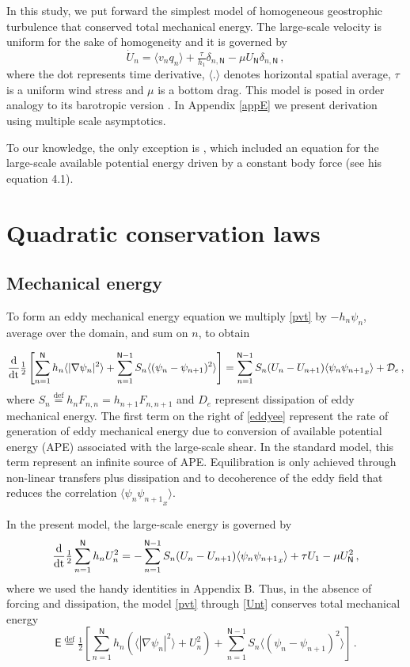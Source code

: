\documentclass{jfm}
\newcommand{\defn}{\ensuremath{\stackrel{\mathrm{def}}{=}}}
\def\beq{\begin{equation}}
\def\eeq{\end{equation}}
\newcommand{\com}{\, ,}
\newcommand{\per}{\, .}
\newcommand{\avxy}[1]{\langle{#1}\rangle}
\newcommand{\nmax}{\mathsf{N}}
\newcommand{\disse}{\mathcal{D}_e}
\newcommand{\dd}{\rm d}
\newcommand{\half}{\tfrac{1}{2}}
\newcommand{\sE}{\mathsf{E}}
\begin{document}
In this study, we put forward the simplest model of homogeneous geostrophic
turbulence that conserved total mechanical energy. The
large-scale velocity is uniform for the sake of homogeneity and it is governed by
\beq \label{Unt}
{\dot U_n} = \avxy{v_n q_n} + \tfrac{\tau}{h_1} \delta_{n,\nmax} -
\mu U_{\nmax}\delta_{n,\nmax} \com
\eeq
where the dot represents time derivative, $\avxy{.}$ denotes horizontal spatial
average, $\tau$ is a uniform wind stress and $\mu$ is a bottom drag.
This model is posed in order  analogy to its barotropic version
\citep{carnevale_frederiksen1987}. In Appendix \ref{appE} we present
derivation using multiple scale asymptotics.

To our
knowledge, the only exception is \cite{salmon1980}, which included an equation for
the large-scale available potential energy driven by a constant body force (see
his equation 4.1).

\section{Quadratic conservation laws}\label{sec:cons_laws}

\subsection{Mechanical energy}

To form an eddy mechanical energy equation we multiply \eqref{pvt} by
$-h_n \psi_n$, average over the domain, and sum on $n$, to obtain

\beq\label{eddyee}
  \frac{\dd}{\dd t}\half \left[\sum_{n=1}^{\nmax} h_n \avxy{|\nabla \psi_n|^2} +
  \sum_{n=1}^{\nmax-1} S_n \avxy{(\psi_n-\psi_{n+1})^2}\right]
  = \sum_{n=1}^{\nmax-1} S_n (U_n - U_{n+1})\avxy{\psi_n{\psi_{n+1}}_x}
  + \disse\com
\eeq
where $S_n \defn h_n F_{n,n} = h_{n+1} F_{n,n+1}$ and $D_e$ represent dissipation
of eddy mechanical energy. The first term on the right of \eqref{eddyee} represent
the rate of generation of eddy mechanical energy due to conversion of
available potential energy (APE) associated with the large-scale shear. In the
standard model, this term represent an infinite source of APE. Equilibration is
only achieved through non-linear transfers plus dissipation and to decoherence
of the eddy field that reduces the correlation $\avxy{\psi_n{\psi_{n+1}}_x}$.

In the present model, the large-scale energy is  governed by
\beq \label{largescaleee}
\frac{\dd}{\dd t}\half \sum_{n=1}^{\nmax} h_n U_n^2 =
- \sum_{n=1}^{\nmax-1} S_n (U_n - U_{n+1})\avxy{\psi_n{\psi_{n+1}}_x}
+ \tau U_1 - \mu U_{\nmax}^2\com
\eeq
where we used the handy identities in Appendix B. Thus, in the absence of
forcing and dissipation, the model \eqref{pvt} through \eqref{Unt} conserves
total mechanical energy
\beq\label{meche}
\sE \defn  \half \left[\sum_{n=1}^{\nmax} h_n \left(\avxy{|\nabla \psi_n|^2} +
U_n^2\right) + \sum_{n=1}^{\nmax-1} S_n \avxy{(\psi_n-\psi_{n+1})^2}\right] \per
\eeq
\end{document}
